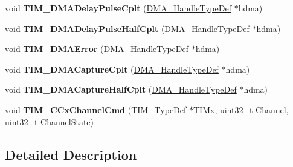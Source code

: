 \begin{DoxyCompactItemize}
void {\bfseries T\+I\+M\+\_\+\+D\+M\+A\+Delay\+Pulse\+Cplt} (\hyperlink{group___d_m_a___exported___types_ga41b754a906b86bce54dc79938970138b}{D\+M\+A\+\_\+\+Handle\+Type\+Def} $\ast$hdma)
\item 
\mbox{\label{group___t_i_m___private___functions_ga8bfc333f26980f4e473a75cdb45de292}} 
void {\bfseries T\+I\+M\+\_\+\+D\+M\+A\+Delay\+Pulse\+Half\+Cplt} (\hyperlink{group___d_m_a___exported___types_ga41b754a906b86bce54dc79938970138b}{D\+M\+A\+\_\+\+Handle\+Type\+Def} $\ast$hdma)
\item 
\mbox{\label{group___t_i_m___private___functions_gaa112bee5279feee040c1ea9e283f7378}} 
void {\bfseries T\+I\+M\+\_\+\+D\+M\+A\+Error} (\hyperlink{group___d_m_a___exported___types_ga41b754a906b86bce54dc79938970138b}{D\+M\+A\+\_\+\+Handle\+Type\+Def} $\ast$hdma)
\item 
\mbox{\label{group___t_i_m___private___functions_ga60b9c315720fddb3db32299f05f7d712}} 
void {\bfseries T\+I\+M\+\_\+\+D\+M\+A\+Capture\+Cplt} (\hyperlink{group___d_m_a___exported___types_ga41b754a906b86bce54dc79938970138b}{D\+M\+A\+\_\+\+Handle\+Type\+Def} $\ast$hdma)
\item 
\mbox{\label{group___t_i_m___private___functions_ga2c2f2f092eaa9414661422f06fdc56a0}} 
void {\bfseries T\+I\+M\+\_\+\+D\+M\+A\+Capture\+Half\+Cplt} (\hyperlink{group___d_m_a___exported___types_ga41b754a906b86bce54dc79938970138b}{D\+M\+A\+\_\+\+Handle\+Type\+Def} $\ast$hdma)
\item 
\mbox{\label{group___t_i_m___private___functions_ga7fcc6d5ca311c37f5d0250687c899924}} 
void {\bfseries T\+I\+M\+\_\+\+C\+Cx\+Channel\+Cmd} (\hyperlink{struct_t_i_m___type_def}{T\+I\+M\+\_\+\+Type\+Def} $\ast$T\+I\+Mx, uint32\+\_\+t Channel, uint32\+\_\+t Channel\+State)
\end{DoxyCompactItemize}


\subsection{Detailed Description}
